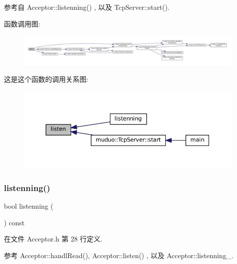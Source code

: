 参考自 Acceptor\+::listenning() , 以及 Tcp\+Server\+::start().

函数调用图\+:
\nopagebreak
\begin{figure}[H]
\begin{center}
\leavevmode
\includegraphics[width=350pt]{classmuduo_1_1Acceptor_a458bbe4cf81360301586b2e62a7f9dd2_cgraph}
\end{center}
\end{figure}
这是这个函数的调用关系图\+:
\nopagebreak
\begin{figure}[H]
\begin{center}
\leavevmode
\includegraphics[width=350pt]{classmuduo_1_1Acceptor_a458bbe4cf81360301586b2e62a7f9dd2_icgraph}
\end{center}
\end{figure}
\mbox{\label{classmuduo_1_1Acceptor_a43301d614b7aaae820d7ddd7033984f5}} 
\subsubsection{\texorpdfstring{listenning()}{listenning()}}
{\footnotesize\ttfamily bool listenning (\begin{DoxyParamCaption}{ }\end{DoxyParamCaption}) const\hspace{0.3cm}{\ttfamily [inline]}}



在文件 Acceptor.\+h 第 28 行定义.



参考 Acceptor\+::handl\+Read(), Acceptor\+::listen() , 以及 Acceptor\+::listenning\+\_\+.

